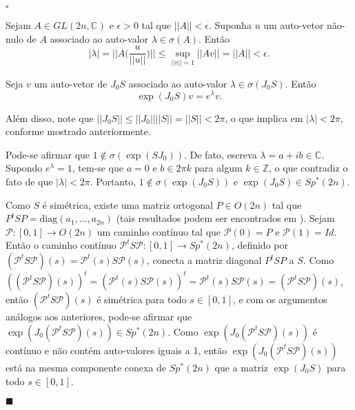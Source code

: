 \documentclass[12pt]{book}
\newenvironment{prova}[1]{$\square$ #1}{\hfill$\blacksquare$}
\newcommand{\bigparenteses}[1]{\Big( #1 \Big) }
\newcommand{\complexo}[1]{\mathbb{C}^{#1}}
\newcommand{\diag}{\text{diag}}
\newcommand{\espectrooperador}[1]{\sigma(#1)}
\newcommand{\estruturacomplexa}{J_{0}}
\newcommand{\generalgroup}[2]{GL(#1, #2)}
\newcommand{\generalgroupcomplexo}[1]{\generalgroup{#1}{\complexo{}}}
\newcommand{\gruposimpleticonaodegenerado}[1]{Sp^{#1}(2n)}
\newcommand{\inteiros}{\mathbb{Z}}
\newcommand{\intervalo}{[0,1]}
\newcommand{\matrizortogonal}[1]{O(#1)}
\newcommand{\norma}[1]{||#1||}
\newcommand{\normagrande}[1]{\Big|\Big|#1\Big|\Big|}
\begin{document}
\begin{prova}
\begin{enumerate}
			Sejam $A \in \generalgroupcomplexo{2n}$ e $\epsilon>0$ tal que $\norma{A}<\epsilon$. Suponha $u$ um auto-vetor não-nulo de $A$ associado ao auto-valor $\lambda\in \espectrooperador{A}$. Então 
			$$
			|\lambda|=\normagrande{A\bigparenteses{\frac{u}{\norma{u}}} }\leq \sup_{\norma{v}=1 } \norma{Av} = \norma{A}<\epsilon.
			$$
			
			
			Seja $v$ um auto-vetor de $\estruturacomplexa S$ associado ao auto-valor $\lambda \in \espectrooperador{\estruturacomplexa S}$. Então 
			$$
			\exp(\estruturacomplexa S)v = e^{\lambda}v.
			$$
			
			Além disso, note que $\norma{\estruturacomplexa S}\leq \norma{\estruturacomplexa}\norma{S} = \norma{S} <2\pi$, o que implica em $|\lambda|<2\pi$, conforme mostrado anteriormente.
			
			Pode-se afirmar que $1\notin \espectrooperador{\exp(S\estruturacomplexa)}$. De fato, escreva $\lambda = a+ib\in \complexo{}$. Supondo $e^{\lambda} = 1$, tem-se que $a=0$ e $b \in 2\pi k$ para algum $k\in \inteiros$, o que contradiz o fato de que $|\lambda| <2\pi$. Portanto, $1\notin\espectrooperador{\exp(\estruturacomplexa S)}$ e $\exp(\estruturacomplexa S)\in \gruposimpleticonaodegenerado{*}$.
			
			Como $S$ é simétrica, existe uma matriz ortogonal $P \in \matrizortogonal{2n}$ tal que $P^{t}SP=\diag(a_{1},\dots,a_{2n})$ (tais resultados podem ser encontrados em \cite{hoffman_kunze}). Sejam $\mathcal{P}:[0,1]\to \matrizortogonal{2n}$ um caminho contínuo tal que $\mathcal{P}(0) = P$ e $\mathcal{P}(1)=Id$. 
			Então o caminho contínuo $\mathcal{P}^{t}S\mathcal{P}:\intervalo\to \gruposimpleticonaodegenerado{*}$, definido por $(\mathcal{P}^{t}S\mathcal{P})(s)=\mathcal{P}^{t}(s)S\mathcal{P}(s)$, conecta a matriz diagonal $P^{t}SP$ a $S$. Como $ ((\mathcal{P}^{t}S\mathcal{P})(s))^{t} =(\mathcal{P}^{t}(s)S\mathcal{P}(s))^{t} = \mathcal{P}^{t}(s)S\mathcal{P}(s) =(\mathcal{P}^{t}S\mathcal{P})(s)$, então $(\mathcal{P}^{t}S\mathcal{P})(s)$ é simétrica para todo $s\in \intervalo$, e com os argumentos análogos aos anteriores, pode-se afirmar que $\exp(\estruturacomplexa(\mathcal{P}^{t}S\mathcal{P})(s)) \in \gruposimpleticonaodegenerado{*}$. Como $\exp(\estruturacomplexa(\mathcal{P}^{t}S\mathcal{P})(s))$ é contínuo e não contém auto-valores iguais a 1, então $\exp(\estruturacomplexa(\mathcal{P}^{t}S\mathcal{P})(s))$ está na mesma componente conexa de $\gruposimpleticonaodegenerado{*}$ que a matriz $\exp(\estruturacomplexa S)$ para todo $s\in \intervalo$.
			

\end{enumerate}
\end{prova}
\end{document}
